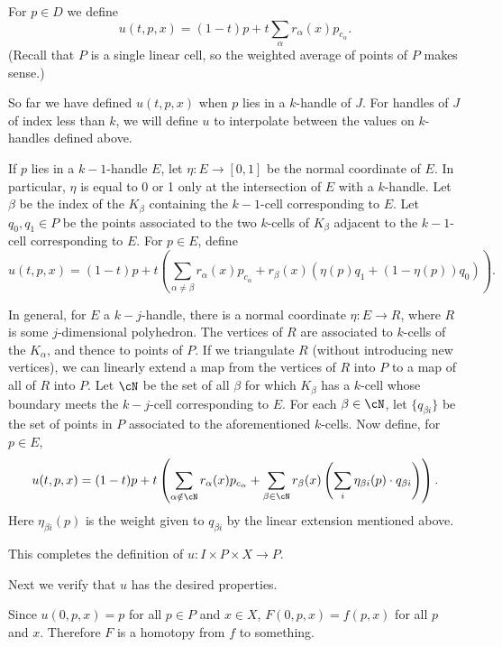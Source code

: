 \documentclass[11pt,leqno]{article}
\newcommand{\eq}[1]{\begin{displaymath}#1\end{displaymath}}
\begin{document}
For $p \in D$ we define
\eq{
	u(t, p, x) = (1-t)p + t \sum_\alpha r_\alpha(x) p_{c_\alpha} .
}
(Recall that $P$ is a single linear cell, so the weighted average of points of $P$
makes sense.)

So far we have defined $u(t, p, x)$ when $p$ lies in a $k$-handle of $J$.
For handles of $J$ of index less than $k$, we will define $u$ to 
interpolate between the values on $k$-handles defined above.

If $p$ lies in a $k{-}1$-handle $E$, let $\eta : E \to [0,1]$ be the normal coordinate 
of $E$.
In particular, $\eta$ is equal to 0 or 1 only at the intersection of $E$
with a $k$-handle.
Let $\beta$ be the index of the $K_\beta$ containing the $k{-}1$-cell
corresponding to $E$.
Let $q_0, q_1 \in P$ be the points associated to the two $k$-cells of $K_\beta$
adjacent to the $k{-}1$-cell corresponding to $E$.
For $p \in E$, define
\eq{
	u(t, p, x) = (1-t)p + t \left( \sum_{\alpha \ne \beta} r_\alpha(x) p_{c_\alpha}
			+ r_\beta(x) (\eta(p) q_1 + (1-\eta(p)) q_0) \right) .
}

In general, for $E$ a $k{-}j$-handle, there is a normal coordinate
$\eta: E \to R$, where $R$ is some $j$-dimensional polyhedron.
The vertices of $R$ are associated to $k$-cells of the $K_\alpha$, and thence to points of $P$.
If we triangulate $R$ (without introducing new vertices), we can linearly extend
a map from the vertices of $R$ into $P$ to a map of all of $R$ into $P$.
Let $\cN$ be the set of all $\beta$ for which $K_\beta$ has a $k$-cell whose boundary meets
the $k{-}j$-cell corresponding to $E$.
For each $\beta \in \cN$, let $\{q_{\beta i}\}$ be the set of points in $P$ associated to the aforementioned $k$-cells.
Now define, for $p \in E$,
\eq{
	u(t, p, x) = (1-t)p + t \left( 
			\sum_{\alpha \notin \cN} r_\alpha(x) p_{c_\alpha}
				+ \sum_{\beta \in \cN} r_\beta(x) \left( \sum_i \eta_{\beta i}(p) \cdot q_{\beta i} \right)
			 \right) .
}
Here $\eta_{\beta i}(p)$ is the weight given to $q_{\beta i}$ by the linear extension
mentioned above.

This completes the definition of $u: I \times P \times X \to P$.

\medskip

Next we verify that $u$ has the desired properties.

Since $u(0, p, x) = p$ for all $p\in P$ and $x\in X$, $F(0, p, x) = f(p, x)$ for all $p$ and $x$.
Therefore $F$ is a homotopy from $f$ to something.
\end{document}
